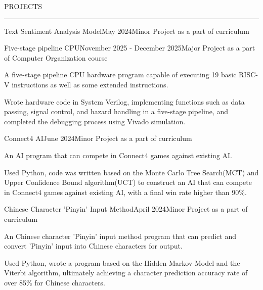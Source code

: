\documentclass{resume} %
\renewenvironment{rSection}[1]{
\sectionskip
\textcolor{TsinghuaPurple}{\MakeUppercase{#1}}
\sectionlineskip
\hrule
\begin{list}{}{
\setlength{\leftmargin}{0em}
}
\item[]
}{
\end{list}
}
\begin{document}
\begin{rSection}{PROJECTS}
\begin{rSubsection}{Text Sentiment Analysis Model}{May 2024}{Minor Project as a part of curriculum}{}
\end{rSubsection}



\begin{rSubsection}{Five-stage pipeline CPU}{November 2025 - December 2025}{Major Project as a part of Computer Organization course}{}

\item A five-stage pipeline CPU hardware program capable of executing 19 basic RISC-V instructions as well as some extended instructions.
\item Wrote hardware code in System Verilog, implementing functions such as data passing, signal control, and hazard handling in a five-stage pipeline, and completed the debugging process using Vivado simulation.

\end{rSubsection}



\begin{rSubsection}{Connect4 AI}{June 2024}{Minor Project as a part of curriculum}{}

\item An AI program that can compete in Connect4 games against existing AI.
\item Used Python, code was written based on the Monte Carlo Tree Search(MCT) and Upper Confidence Bound algorithm(UCT) to construct an AI that can compete in Connect4 games against existing AI, with a final win rate higher than 90\%. 

\end{rSubsection}


\begin{rSubsection}{Chinese Character 'Pinyin' Input Method}{April 2024}{Minor Project as a part of curriculum}{}    

\item An Chinese character 'Pinyin' input method program that can predict and convert 'Pinyin' input into Chinese characters for output.       
\item Used Python, wrote a program based on the Hidden Markov Model and the Viterbi algorithm, ultimately achieving a character prediction accuracy rate of over 85\% for Chinese characters.

\end{rSubsection} 

\end{rSection} 
\end{document}

